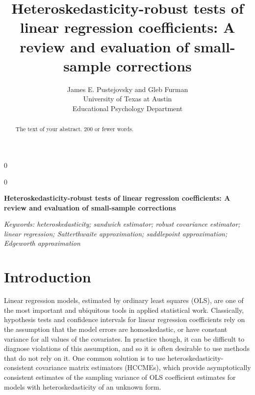 \documentclass[12pt]{article}\usepackage[]{graphicx}\usepackage[]{color}
\newcommand{\blind}{0}
\newcommand{\MyTitle}{Heteroskedasticity-robust tests of linear regression coefficients: A review and evaluation of small-sample corrections}
\begin{document}
%

\def\spacingset#1{\renewcommand{\baselinestretch}%
{#1}\small\normalsize} \spacingset{1}



\blind
{
  \title{\bf \MyTitle}
  \author{James E. Pustejovsky and Gleb Furman \\
    University of Texas at Austin \\
    Educational Psychology Department}
  \maketitle
} \fi

\blind
{
  \bigskip
  \bigskip
  \bigskip
  \begin{center}
    {\LARGE\bf \MyTitle}
\end{center}
  \medskip
} \fi

\bigskip
\begin{abstract}
The text of your abstract.  200 or fewer words.
\end{abstract}

\noindent%
{\it Keywords: heteroskedasticity; sandwich estimator; robust covariance estimator; linear regression; Satterthwaite approximation; saddlepoint approximation; Edgeworth approximation} 
\vfill

\newpage
\spacingset{1.45} %

\section{Introduction}
\label{sec:intro}

Linear regression models, estimated by ordinary least squares (OLS), are one of the most important and ubiquitous tools in applied statistical work.
Classically, hypothesis tests and confidence intervals for linear regression coefficients rely on the assumption that the model errors are homoskedastic, or have constant variance for all values of the covariates. 
In practice though, it can be difficult to diagnose violations of this assumption, and so it is often desirable to use methods that do not rely on it. 
One common solution is to use heteroskedasticity-consistent covariance matrix estimators (HCCMEs), which provide asymptotically consistent estimates of the sampling variance of OLS coefficient estimates for models with heteroskedasticity of an unknown form. 
\end{document}
